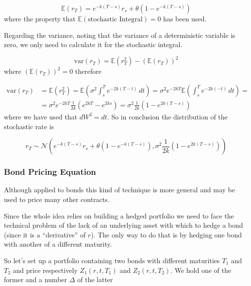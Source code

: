 \begin{equation}
\mathbb{E}(r_T)=e^{-k(T-s)} r_s+\theta\left(1-e^{-k(T-s)}\right)
\end{equation}
where the property that $\mathbb{E}(\textrm{stochastic~Integral}) = 0$ has been used.

Regarding the variance, noting that the variance of a deterministic variable is zero, we only need to calculate it for the stochastic integral. %

\begin{equation*}
\textrm{var}(r_T)=\mathbb{E}(r^2_T)-(\mathbb{E}(r_T))^2
\end{equation*}
where $(\mathbb{E}(r_T))^2 = 0$ therefore

\begin{equation}
\begin{aligned}
\textrm{var}(r_T)&=\mathbb{E}(r^2_T)=\mathbb{E}(\sigma^2 \int^T_s e^{-2k(T-t)}\,dt)=\sigma^2 e^{-2kT} \mathbb{E}( \int^T_s e^{-2k(-t)}\,dt)=\\
&=\sigma^2 e^{-2kT} \frac {1}{2k}(e^{2kT}-e^{2ks})=\sigma^2 \frac {1}{2k}(1-e^{2k(T-s)}) 
\end{aligned}
\end{equation}
where we have used that $dW^2 = dt$.
So in conclusion the distribution of the stochastic rate is

\begin{equation}
r_T \sim \mathcal{N}(e^{-k(T-s)} r_s+\theta(1-e^{-k(T-s)}),\sigma^2 \frac {1}{2k}(1-e^{2k(T-s)}))
\end{equation}

\subsubsection{Bond Pricing Equation}\label{bond-pricing-equation}

Although applied to bonds this kind of technique is more general and may be used to price many other contracts.

Since the whole idea relies on building a hedged portfolio we need to face the technical problem of the lack of an underlying asset with which
to hedge a bond (since it is a ``derivative'' of $r$). The only way to do that is by hedging one bond with another of a different maturity.

So let's set up a portfolio containing two bonds with different maturities $T_1$ and $T_2$ and price respectively $Z_1(r, t, T_1)$
and $Z_2(r, t, T_2)$. We hold one of the former and a number $\Delta$ of the latter

